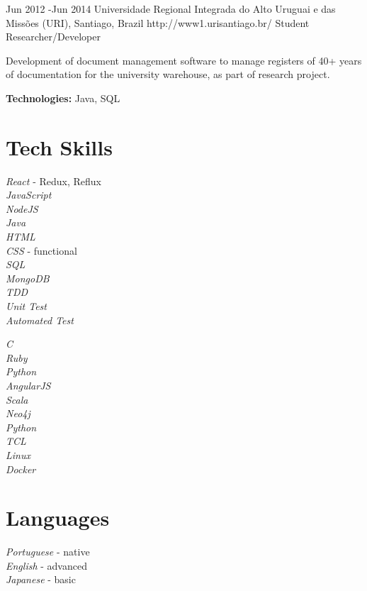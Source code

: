 \documentclass[10pt]{article} %
\begin{document}
\job
{Jun 2012 -}{Jun 2014}
{Universidade Regional Integrada do Alto Uruguai e das Missões (URI), Santiago, Brazil}
{http://www1.urisantiago.br/}
{Student Researcher/Developer}
{Development of document management software to manage registers of 40+ years of documentation for the university warehouse, as part of research project. \\
\rule{0mm}{5mm}\textbf{Technologies:} Java, SQL}


\section{Tech Skills}

{
\textit{React} - Redux, Reflux\\
\textit{JavaScript}\\
\textit{NodeJS}\\
\textit{Java}\\
\textit{HTML}\\
\textit{CSS} - functional\\
\textit{SQL}\\
\textit{MongoDB}\\
\textit{TDD}\\
\textit{Unit Test}\\
\textit{Automated Test}\\
}


{
\textit{C}\\
\textit{Ruby}\\
\textit{Python}\\
\textit{AngularJS}\\
\textit{Scala}\\
\textit{Neo4j}\\
\textit{Python}\\
\textit{TCL}\\
\textit{Linux}\\
\textit{Docker}\\
}



\section{Languages}
{
\textit{Portuguese} - native\\
\textit{English} - advanced\\
\textit{Japanese} - basic\\
}
\end{document}
